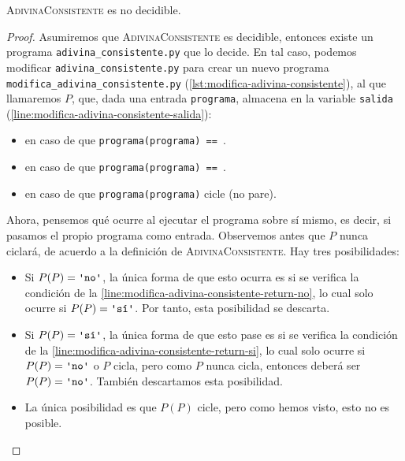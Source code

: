 \begin{proposicion}\label{prop:adivina-consistente-no-decidible}
\textsc{AdivinaConsistente} es no decidible.
\end{proposicion}
\begin{proof}
Asumiremos que \textsc{AdivinaConsistente} es decidible, entonces existe un programa \texttt{adivina\_consistente.py} que lo decide. En tal caso, podemos modificar \linebreak\texttt{adivina\_consistente.py} para crear un nuevo programa \texttt{modifica\_adivina\_consistente.py} (\cref{lst:modifica-adivina-consistente}), al que llamaremos $P$, que, dada una entrada \texttt{programa}, almacena en la variable \texttt{salida} (\cref{line:modifica-adivina-consistente-salida}):
\begin{itemize}
    \item {} en caso de que \texttt{programa(programa) == }.
    \item {} en caso de que \texttt{programa(programa) == }.
    \item {} en caso de que \texttt{programa(programa)} cicle (no pare).
\end{itemize}

Ahora, pensemos qué ocurre al ejecutar el programa sobre sí mismo, es decir, si pasamos el propio programa como entrada. Observemos antes que $P$ nunca ciclará, de acuerdo a la definición de \textsc{AdivinaConsistente}. Hay tres posibilidades:
\begin{itemize}
    \item Si $P(P)=\palabra{no}$, la única forma de que esto ocurra es si se verifica la condición de la \cref{line:modifica-adivina-consistente-return-no}, lo cual solo ocurre si $P(P)=\palabra{sí}$. Por tanto, esta posibilidad se descarta.
    \item Si $P(P)=\palabra{sí}$, la única forma de que esto pase es si se verifica la condición de la \cref{line:modifica-adivina-consistente-return-si}, lo cual solo ocurre si $P(P)=\palabra{no}$ o $P$ cicla, pero como $P$ nunca cicla, entonces deberá ser $P(P)=\palabra{no}$. También descartamos esta posibilidad.
    \item La única posibilidad es que $P(P)$ cicle, pero como hemos visto, esto no es posible.\vspace*{-0.8cm}
\end{itemize}
\end{proof}

